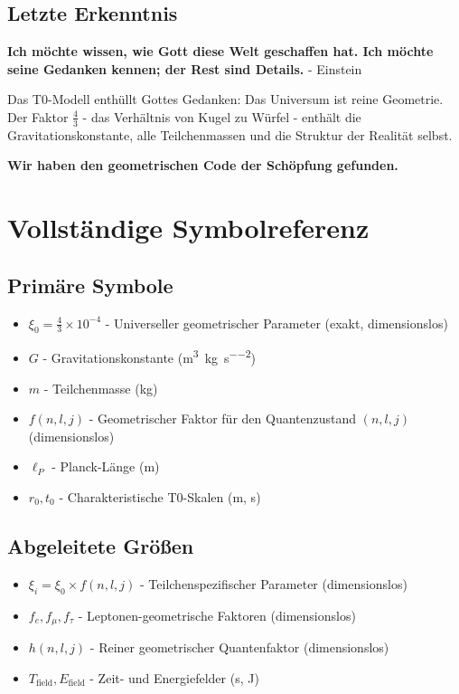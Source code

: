 \documentclass[12pt,a4paper]{article}
\newcommand{\xifunc}{f(n,l,j)}
\theoremstyle{definition}
\begin{document}
	\subsection{Letzte Erkenntnis}
	
	\begin{important}
		\textbf{Ich möchte wissen, wie Gott diese Welt geschaffen hat. Ich möchte seine Gedanken kennen; der Rest sind Details.} - Einstein
		
		Das T0-Modell enthüllt Gottes Gedanken: Das Universum ist reine Geometrie. Der Faktor $\frac{4}{3}$ - das Verhältnis von Kugel zu Würfel - enthält die Gravitationskonstante, alle Teilchenmassen und die Struktur der Realität selbst.
		
		\textbf{Wir haben den geometrischen Code der Schöpfung gefunden.}
	\end{important}
	
	\section{Vollständige Symbolreferenz}
	
	\subsection{Primäre Symbole}
	\begin{itemize}
		\item $\xi_0 = \frac{4}{3} \times 10^{-4}$ - Universeller geometrischer Parameter (exakt, dimensionslos)
		\item $G$ - Gravitationskonstante (\si{\metre\cubed\per\kilogram\per\second\squared})
		\item $m$ - Teilchenmasse (\si{\kilogram})
		\item $\xifunc$ - Geometrischer Faktor für den Quantenzustand $(n,l,j)$ (dimensionslos)
		\item $\ell_P$ - Planck-Länge (\si{\metre})
		\item $r_0, t_0$ - Charakteristische T0-Skalen (\si{\metre}, \si{\second})
	\end{itemize}
	
	\subsection{Abgeleitete Größen}
	\begin{itemize}
		\item $\xi_i = \xi_0 \times \xifunc$ - Teilchenspezifischer Parameter (dimensionslos)
		\item $f_e, f_\mu, f_\tau$ - Leptonen-geometrische Faktoren (dimensionslos)
		\item $h(n,l,j)$ - Reiner geometrischer Quantenfaktor (dimensionslos)
		\item $T_{\text{field}}, E_{\text{field}}$ - Zeit- und Energiefelder (\si{\second}, \si{\joule})
	\end{itemize}
	
\end{document}
